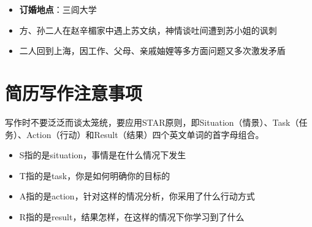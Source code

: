 \documentclass{resume}
\begin{document}
\begin{itemize}[parsep=0.5ex]
  \item \textbf{订婚地点}：三闾大学
  \item 方、孙二人在赵辛楣家中遇上苏文纨，神情谈吐间遭到苏小姐的讽刺
  \item 二人回到上海，因工作、父母、亲戚妯娌等多方面问题又多次激发矛盾
\end{itemize}

\section{简历写作注意事项}

写作时不要泛泛而谈太笼统，要应用STAR原则，即Situation（情景）、Task（任务）、Action（行动）和Result（结果）四个英文单词的首字母组合。

\begin{itemize}[parsep=0.5ex]
  \item S指的是situation，事情是在什么情况下发生
  \item T指的是task，你是如何明确你的目标的
  \item A指的是action，针对这样的情况分析，你采用了什么行动方式
  \item R指的是result，结果怎样，在这样的情况下你学习到了什么
\end{itemize}
\end{document}
